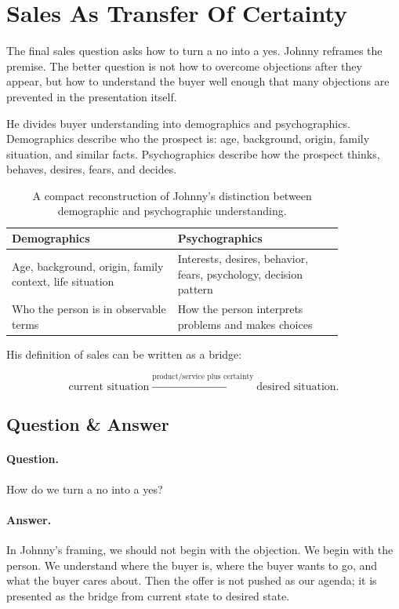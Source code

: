 \section{Sales As Transfer Of Certainty}

The final sales question asks how to turn a no into a yes. Johnny reframes the premise. The better question is not how to overcome objections after they appear, but how to understand the buyer well enough that many objections are prevented in the presentation itself.

He divides buyer understanding into demographics and psychographics. Demographics describe who the prospect is: age, background, origin, family situation, and similar facts. Psychographics describe how the prospect thinks, behaves, desires, fears, and decides.

\begin{table}
\centering
\begin{tabular}{|p{0.42\linewidth}|p{0.42\linewidth}|}
\hline
\textbf{Demographics} & \textbf{Psychographics} \\
\hline
Age, background, origin, family context, life situation & Interests, desires, behavior, fears, psychology, decision pattern \\
\hline
Who the person is in observable terms & How the person interprets problems and makes choices \\
\hline
\end{tabular}
\caption{A compact reconstruction of Johnny's distinction between demographic and psychographic understanding.}
\end{table}

His definition of sales can be written as a bridge:

\begin{equation}
\text{current situation}
\xrightarrow{\text{product/service plus certainty}}
\text{desired situation}.
\end{equation}

\subsection{Question \& Answer}

\paragraph{Question.}
How do we turn a no into a yes?

\paragraph{Answer.}
In Johnny's framing, we should not begin with the objection. We begin with the person. We understand where the buyer is, where the buyer wants to go, and what the buyer cares about. Then the offer is not pushed as our agenda; it is presented as the bridge from current state to desired state.

